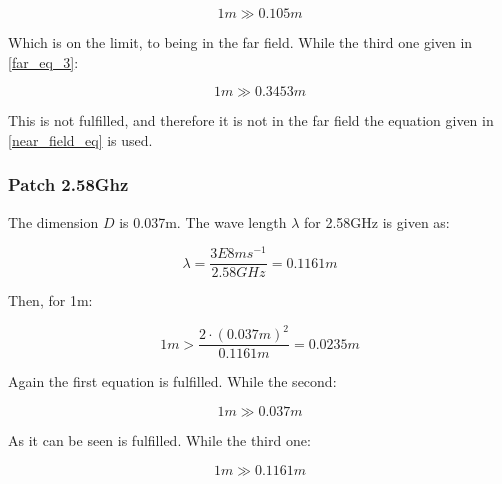 \begin{equation}
1m \gg 0.105m
\end{equation}

Which is on the limit, to  being in the far field. While the third one given in \ref{far_eq_3}:

\begin{equation}
1m \gg 0.3453m
\end{equation}

This is not fulfilled, and therefore it is not in the far field the equation given in \ref{near_field_eq} is used.
\newpage

\subsubsection{Patch 2.58Ghz}

The dimension $D$ is 0.037m. The wave length $\lambda$ for 2.58GHz is given as:

\begin{equation}
\lambda = \frac{3E8 ms^{-1}}{2.58 GHz} = 0.1161m
\end{equation}

Then, for 1m:

\begin{equation}
1m > \frac{2 \cdot (0.037m)^{2}}{0.1161m} = 0.0235m
\end{equation} 

Again the first equation is fulfilled. While the second:

\begin{equation}
1m \gg 0.037m
\end{equation}

As it can be seen is fulfilled. While the third one:

\begin{equation}
1m \gg 0.1161m
\end{equation}



 




